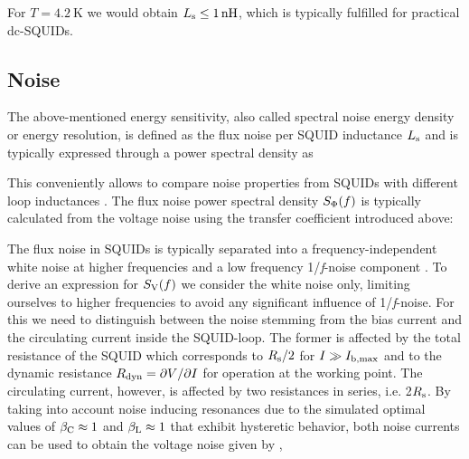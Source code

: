 
For $T=\qty{4.2}{\kelvin}$ we would obtain $L_{\rm s}\leq\qty{1}{n\henry}$, which is typically fulfilled for practical dc-SQUIDs.

\subsection{Noise}
\label{subsec_noise_theo}

The above-mentioned energy sensitivity, also called spectral noise energy density or energy resolution, is defined as the flux noise per SQUID inductance $L_{\rm s}$ and is typically expressed through a power spectral density as 


This conveniently allows to compare noise properties from SQUIDs with different loop inductances \cite{Ferring-Siebert2024}. The flux noise power spectral density $S_{\rm \Phi}(f)$ is typically calculated from the voltage noise using the transfer coefficient introduced above: 


The flux noise in SQUIDs is typically separated into a frequency-independent white noise at higher frequencies and a low frequency 1/\textit{f}-noise component \cite{Koch2007}. To derive an expression for $S_{\rm V}(f)$ we consider the white noise only, limiting ourselves to higher frequencies to avoid any significant influence of 1/\textit{f}-noise. For this we need to distinguish between the noise stemming from the bias current and the circulating current inside the SQUID-loop. The former is affected by the total resistance of the SQUID which corresponds to ${R_{\rm s}}/{2}$ for $I\gg I_{\rm b,max}$ and to the dynamic resistance $R_{\rm dyn}={\partial V}/{\partial I}$ for operation at the working point. The circulating current, however, is affected by two resistances in series, i.e. 2$R_{\rm s}$. By taking into account noise inducing resonances due to the simulated optimal values of $\beta_{\rm C}\approx 1$ and $\beta_{\rm L}\approx 1$ that exhibit hysteretic behavior, both noise currents can be used to obtain the voltage noise given by \cite{Tesche1977}, \cite{Bruines1982}
 
